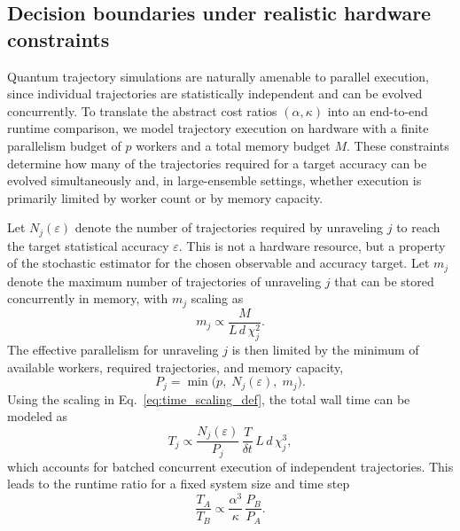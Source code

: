 \documentclass[aps, pra, superscriptaddress, reprint, floatfix]{revtex4-2}
\theoremstyle{plain}
\begin{document}
\subsection{Decision boundaries under realistic hardware constraints}
Quantum trajectory simulations are naturally amenable to parallel execution, since individual trajectories are statistically independent and can be evolved concurrently. To translate the abstract cost ratios $(\alpha,\kappa)$ into an end-to-end runtime comparison, we model trajectory execution on hardware with a finite parallelism budget of $p$ workers and a total memory budget $M$. These constraints determine how many of the trajectories required for a target accuracy can be evolved simultaneously and, in large-ensemble settings, whether execution is primarily limited by worker count or by memory capacity.

Let $N_j(\varepsilon)$ denote the number of trajectories required by unraveling $j$ to reach the target statistical accuracy $\varepsilon$. This is not a hardware resource, but a property of the stochastic estimator for the chosen observable and accuracy target. Let $m_j$ denote the maximum number of trajectories of unraveling $j$ that can be stored concurrently in memory, with $m_j$ scaling as
\begin{equation}
m_j \propto \frac{M}{L\, d\, \chi_j^2}.
\label{eq:mj_def}
\end{equation}
The effective parallelism for unraveling $j$ is then limited by the minimum of available workers, required trajectories, and memory capacity,
\begin{equation}
P_j = \min\!\bigl(p,\; N_j(\varepsilon),\; m_j\bigr).
\label{eq:Pj_def_cost}
\end{equation}
Using the scaling in Eq.~\eqref{eq:time_scaling_def}, the total wall time can be modeled as
\begin{equation}
T_j \propto \frac{N_j(\varepsilon)}{P_j}\,\frac{T}{\delta t}\,L\,d\,\chi_j^3,
\label{eq:Tj_cost_model}
\end{equation}
which accounts for batched concurrent execution of independent trajectories. This leads to the runtime ratio for a fixed system size and time step
\begin{equation}
\frac{T_A}{T_B}
\propto
\frac{\alpha^3}{\kappa}\,\frac{P_B}{P_A}.
\label{eq:TA_TB_cost}
\end{equation}
\end{document}
